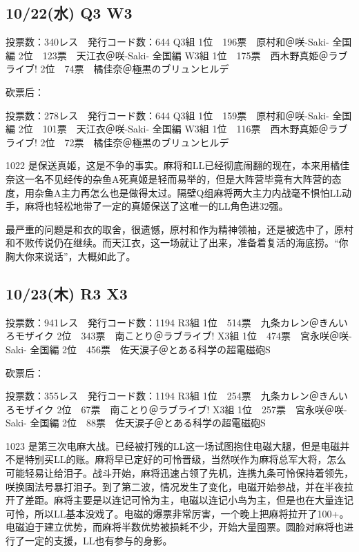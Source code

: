 \subsection{10/22(水) Q3 W3}

    投票数：340レス　発行コード数：644
    Q3組
    1位　196票　原村和＠咲-Saki- 全国編
    2位　123票　天江衣＠咲-Saki- 全国編
    W3組
    1位　175票　西木野真姫＠ラブライブ!
    2位　74票　橘佳奈＠極黒のブリュンヒルデ

砍票后：

    投票数：278レス　発行コード数：644
    Q3組
    1位　159票　原村和＠咲-Saki- 全国編
    2位　101票　天江衣＠咲-Saki- 全国編
    W3組
    1位　116票　西木野真姫＠ラブライブ!
    2位　72票　橘佳奈＠極黒のブリュンヒルデ

1022 是保送真姬，这是不争的事实。麻将和LL已经彻底闹翻的现在，本来用橘佳奈这一名不见经传的杂鱼A死真姬是轻而易举的，但是大阵营毕竟有大阵营的态度，用杂鱼A主力再怎么也是做得太过。隔壁Q组麻将两大主力内战毫不惧怕LL动手，麻将也轻松地带了一定的真姬保送了这唯一的LL角色进32强。

最严重的问题是和衣的取舍，很遗憾，原村和作为精神领袖，还是被选中了，原村和不败传说仍在继续。而天江衣，这一场就让了出来，准备着复活的海底捞。“你胸大你来说话”，大概如此了。

\subsection{10/23(木) R3 X3}

    投票数：941レス　発行コード数：1194
    R3組
    1位　514票　九条カレン＠きんいろモザイク
    2位　343票　南ことり＠ラブライブ!
    X3組
    1位　474票　宮永咲＠咲-Saki- 全国編
    2位　456票　佐天涙子＠とある科学の超電磁砲S

砍票后：

    投票数：355レス　発行コード数：1194
    R3組
    1位　254票　九条カレン＠きんいろモザイク
    2位　67票　南ことり＠ラブライブ!
    X3組
    1位　257票　宮永咲＠咲-Saki- 全国編
    2位　88票　佐天涙子＠とある科学の超電磁砲S

1023 是第三次电麻大战。已经被打残的LL这一场试图抱住电磁大腿，但是电磁并不是特别买LL的账。麻将早已定好的可怜晋级，当然咲作为麻将总军大将，怎么可能轻易让给泪子。战斗开始，麻将迅速占领了先机，连携九条可怜保持着领先，咲换固法号暴打泪子。到了第二波，情况发生了变化，电磁开始参战，并在半夜拉开了差距。麻将主要是以连记可怜为主，电磁以连记小鸟为主，但是也在大量连记可怜，所以LL基本没戏了。电磁的爆票非常厉害，一个晚上把麻将拉开了100+。电磁迫于建立优势，而麻将半数优势被损耗不少，开始大量囤票。圆脸对麻将也进行了一定的支援，LL也有参与的身影。

